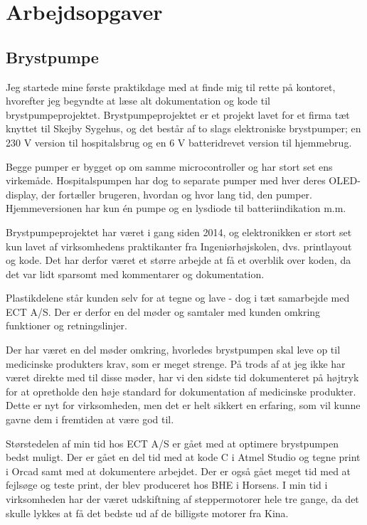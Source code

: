 \chapter{Arbejdsopgaver}

\section{Brystpumpe}

Jeg startede mine første praktikdage med at finde mig til rette på kontoret, hvorefter jeg begyndte at læse alt dokumentation og kode til brystpumpeprojektet. Brystpumpeprojektet er et projekt lavet for et firma tæt knyttet til Skejby Sygehus, og det består af to slags elektroniske brystpumper; en 230 V version til hospitalsbrug og en 6 V batteridrevet version til hjemmebrug. 

Begge pumper er bygget op om samme microcontroller og har stort set ens virkemåde. Hospitalspumpen har dog to separate pumper med hver deres OLED-display, der fortæller brugeren, hvordan og hvor lang tid, den pumper. Hjemmeversionen har kun én pumpe og en lysdiode til batteriindikation m.m.

Brystpumpeprojektet har været i gang siden 2014, og elektronikken er stort set kun lavet af virksomhedens praktikanter fra Ingeniørhøjskolen, dvs. printlayout og kode. Det har derfor været et større arbejde at få et overblik over koden, da det var lidt sparsomt med kommentarer og dokumentation.

Plastikdelene står kunden selv for at tegne og lave - dog i tæt samarbejde med ECT A/S. Der er derfor en del møder og samtaler med kunden omkring funktioner og retningslinjer.

Der har været en del møder omkring, hvorledes brystpumpen skal leve op til medicinske produkters krav, som er meget strenge. På trods af at jeg ikke har været direkte med til disse møder, har vi den sidste tid dokumenteret på højtryk for at opretholde den høje standard for dokumentation af medicinske produkter. Dette er nyt for virksomheden, men det er helt sikkert en erfaring, som vil kunne gavne dem i fremtiden at være god til.

Størstedelen af min tid hos ECT A/S er gået med at optimere brystpumpen bedst muligt. Der er gået en del tid med at kode C i Atmel Studio og tegne print i Orcad samt med at dokumentere arbejdet. Der er også gået meget tid med at fejlsøge og teste print, der blev produceret hos BHE i Horsens. I min tid i virksomheden har der været udskiftning af steppermotorer hele tre gange, da det skulle lykkes at få det bedste ud af de billigste motorer fra Kina.

